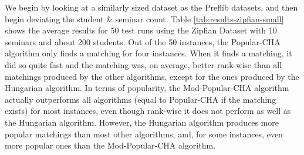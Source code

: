\begin{table}[h!]
  \centering
  \caption{Average results for small Zipfian dataset with 50 runs}
  \label{tab:results-zipfian-small}
\end{table}

We begin by looking at a similarly sized dataset as the Preflib datasets, and then begin deviating the student \& seminar count. Table \ref{tab:results-zipfian-small} shows the average results for 50 test runs using the Zipfian Dataset with 10 seminars and about 200 students. Out of the 50 instances, the Popular-CHA algorithm only finds a matching for four instances. When it finds a matching, it did so quite fast and the matching was, on average, better rank-wise than all matchings produced by the other algorithms, except for the ones produced by the Hungarian algorithm. In terms of popularity, the Mod-Popular-CHA algorithm actually outperforms all algorithms (equal to Popular-CHA if the matching exists) for most instances, even though rank-wise it does not perform as well as the Hungarian algorithm. However, the Hungarian algorithm produces more popular matchings than most other algorithms, and, for some instances, even more popular ones than the Mod-Popular-CHA algorithm.

